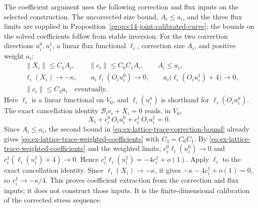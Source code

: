 The coefficient argument uses the following correction and flux inputs
on the selected construction. The uncorrected size bound, $A_i\le a_i$,
and the three flux limits are supplied in Proposition~\ref{prop:c14-joint-calibrated-curve}; the bounds
on the solved coefficients follow from stable inversion. For the two correction
directions $u_i^0,u_i^1$, a linear flux functional $\ell_i$, correction size
$A_i$, and positive weight $a_i$:
\begin{align}
 &\|X_i\|\leq C_1A_i,\qquad \|c_i\|\leq C_0C_1A_i,
   \qquad A_i\leq a_i,
   \label{eq:ex-lattice-trace-correction-bound}\\
 &\ell_i(X_i)\longrightarrow-\kappa,
   \qquad a_i\ell_i(O_iu_i^0)\longrightarrow0,
   \qquad a_i\bigl(\ell_i(O_iu_i^1)+4\bigr)\longrightarrow0,
   \label{eq:ex-lattice-trace-flux-input}\\
 &\|c_i\|\leq C_3 a_i\quad\text{eventually}.
   \label{eq:ex-lattice-trace-weighted-coefficients}
\end{align}
Here $\ell_i$ is a linear functional on $V_0$, and $\ell_i(u_i^a)$ is
shorthand for $\ell_i(O_iu_i^a)$.  The exact cancellation identity
$\mathcal B_ic_i+X_i=0$ reads, in $V_0$,
\[
 X_i+c_i^0\,O_iu_i^0+c_i^1\,O_iu_i^1=0.
\]
Since $A_i\le a_i$, the second bound in
\eqref{eq:ex-lattice-trace-correction-bound} already gives
\eqref{eq:ex-lattice-trace-weighted-coefficients} with $C_3=C_0C_1$.
By \eqref{eq:ex-lattice-trace-weighted-coefficients} and the weighted limits,
$c_i^0\ell_i(u_i^0)\to0$ and
$c_i^1(\ell_i(u_i^1)+4)\to0$. Hence
$c_i^1\ell_i(u_i^1)=-4c_i^1+o(1)$. Apply $\ell_i$ to the exact cancellation
identity. Since $\ell_i(X_i)\to-\kappa$, it gives
$-\kappa-4c_i^1+o(1)=0$, so $c_i^1\to-\kappa/4$. This proves coefficient extraction from the correction and flux inputs;
it does not construct those inputs. It is the finite-dimensional
calibration of the corrected stress sequence.

